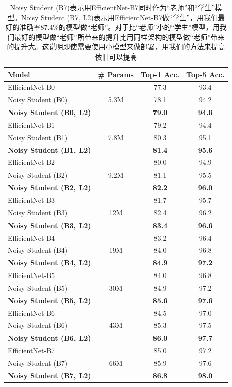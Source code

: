 \documentclass[10pt]{article}
\begin{document}
\begin{table}[h!]
	\centering
	\footnotesize
	\begin{tabular}{l|c|cc}
		\toprule
		Model & \# Params & Top-1 Acc. & Top-5 Acc. \\
		\midrule 
		EfficientNet-B0 & \multirow{3}{*}{5.3M} & 77.3 & 93.4  \\
		Noisy Student (B0) & & 78.1 & 94.2 \\
		\bf Noisy Student (B0, L2) & & \bf 79.0 & \bf 94.6\\
		\midrule
		EfficientNet-B1 & \multirow{3}{*}{7.8M} & 79.2 & 94.4  \\
		Noisy Student (B1) & & 80.3 & 95.1 \\
		\bf Noisy Student (B1, L2) & & \bf 81.4 & \bf 95.6 \\
		\midrule
		EfficientNet-B2 & \multirow{3}{*}{9.2M} & 80.0 & 94.9 \\
		Noisy Student (B2) & & 81.1 & 95.5 \\
		\bf Noisy Student (B2,  L2) & & \bf 82.2 & \bf 96.0 \\
		\midrule
		EfficientNet-B3 & \multirow{3}{*}{12M} & 81.7 & 95.7  \\
		Noisy Student (B3) & & 82.4 & 96.2 \\
		\bf Noisy Student (B3, L2) & & \bf 83.4  & \bf 96.6 \\
		\midrule
		EfficientNet-B4 & \multirow{3}{*}{19M} & 83.2 &  96.4 \\
		Noisy Student (B4) & & 84.0 & 96.8  \\
		\bf Noisy Student (B4, L2) & & \bf 84.9 & \bf 97.2 \\
		\midrule
		EfficientNet-B5 & \multirow{3}{*}{30M} & 84.0 & 96.8  \\
		Noisy Student (B5) & & 84.9  & 97.2 \\
		\bf Noisy Student (B5, L2) & & \bf 85.6 & \bf 97.6 \\
		\midrule
		EfficientNet-B6 & \multirow{3}{*}{43M} & 84.5 & 97.0  \\
		Noisy Student (B6) & & 85.3 & 97.5 \\
		\bf Noisy Student (B6, L2) & & \bf 86.0 & \bf 97.7 \\
		\midrule
		EfficientNet-B7 & \multirow{3}{*}{66M} & 85.0 & 97.2  \\
		Noisy Student (B7) & & 85.9 & 97.6 \\
		\bf Noisy Student (B7, L2) & & \bf 86.8 & \bf 98.0 \\
		\bottomrule
	\end{tabular}
	\caption{Noisy Student (B7)表示用EfficientNet-B7同时作为“老师”和“学生”模型。Noisy Student (B7, L2)表示用EfficientNet-B7做“学生”，用我们最好的准确率87.4\%的模型做“老师”。对于比“老师”小的“学生”模型，用我们最好的模型做“老师”所带来的提升比用同样架构的模型做“老师”带来的提升大。这说明即使需要使用小模型来做部署，用我们的方法来提高依旧可以提高}
	\label{tab:vary_model_size}
\end{table}
\end{document}
